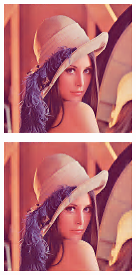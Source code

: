 \documentclass[11pt]{report}
\theoremstyle{plain}
\theoremstyle{remark}
\begin{document}
\begin{figure}
	\centering	
	\begin{subfigure}[b]{0.24\textwidth}
		\centering
		\includegraphics[width=\textwidth]{plaatjes/Lenna_db2_0_1.png}
	\end{subfigure}
	\begin{subfigure}[b]{0.24\textwidth}
		\centering
		\includegraphics[width=\textwidth]{plaatjes/Lenna_db2_0_05.png}

\end{subfigure}
\end{figure}
\end{document}

